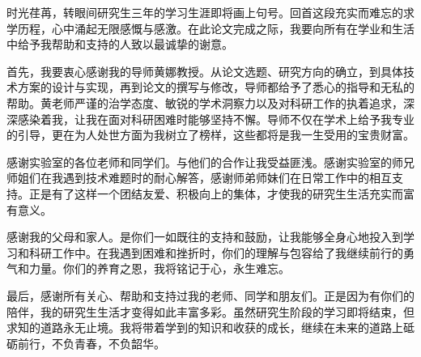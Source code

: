 
\acknowledgement

时光荏苒，转眼间研究生三年的学习生涯即将画上句号。回首这段充实而难忘的求学历程，心中涌起无限感慨与感激。在此论文完成之际，我要向所有在学业和生活中给予我帮助和支持的人致以最诚挚的谢意。

首先，我要衷心感谢我的导师黄娜教授。从论文选题、研究方向的确立，到具体技术方案的设计与实现，再到论文的撰写与修改，导师都给予了悉心的指导和无私的帮助。黄老师严谨的治学态度、敏锐的学术洞察力以及对科研工作的执着追求，深深感染着我，让我在面对科研困难时能够坚持不懈。导师不仅在学术上给予我专业的引导，更在为人处世方面为我树立了榜样，这些都将是我一生受用的宝贵财富。

感谢实验室的各位老师和同学们。与他们的合作让我受益匪浅。感谢实验室的师兄师姐们在我遇到技术难题时的耐心解答，感谢师弟师妹们在日常工作中的相互支持。正是有了这样一个团结友爱、积极向上的集体，才使我的研究生生活充实而富有意义。

感谢我的父母和家人。是你们一如既往的支持和鼓励，让我能够全身心地投入到学习和科研工作中。在我遇到困难和挫折时，你们的理解与包容给了我继续前行的勇气和力量。你们的养育之恩，我将铭记于心，永生难忘。

最后，感谢所有关心、帮助和支持过我的老师、同学和朋友们。正是因为有你们的陪伴，我的研究生生活才变得如此丰富多彩。虽然研究生阶段的学习即将结束，但求知的道路永无止境。我将带着学到的知识和收获的成长，继续在未来的道路上砥砺前行，不负青春，不负韶华。

